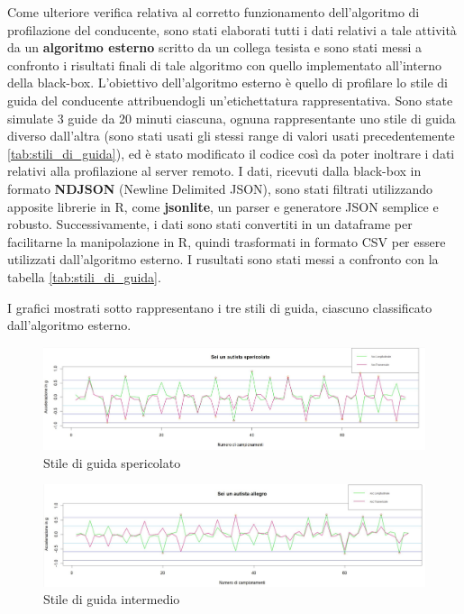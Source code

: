 \documentclass[12pt, a4paper, italian]{report}
\numberwithin{figure}{chapter}
\numberwithin{table}{chapter}
\begin{document}
Come ulteriore verifica relativa al corretto funzionamento dell'algoritmo di profilazione del conducente, sono stati elaborati tutti i dati relativi a tale attività da un \textbf{algoritmo esterno} scritto da un collega tesista e sono stati messi a confronto i risultati finali di tale algoritmo con quello implementato all'interno della black-box. L'obiettivo dell'algoritmo esterno è quello di profilare lo stile di guida del conducente attribuendogli un'etichettatura rappresentativa. Sono state simulate 3 guide da 20 minuti ciascuna, ognuna rappresentante uno stile di guida diverso dall'altra (sono stati usati gli stessi range di valori usati precedentemente \ref{tab:stili_di_guida}), ed è stato modificato il codice così da poter inoltrare i dati relativi alla profilazione al server remoto. I dati, ricevuti dalla black-box in formato \textbf{NDJSON} (Newline Delimited JSON), sono stati filtrati utilizzando apposite librerie in R, come \textbf{jsonlite}, un parser e generatore JSON semplice e robusto. Successivamente, i dati sono stati convertiti in un dataframe per facilitarne la manipolazione in R, quindi trasformati in formato CSV per essere utilizzati dall'algoritmo esterno. I rusultati sono stati messi a confronto con la tabella \ref{tab:stili_di_guida}.

\newpage

I grafici mostrati sotto rappresentano i tre stili di guida, ciascuno classificato dall'algoritmo esterno. 

\vspace{1cm}

\begin{figure}[h]
  \centering
  \includegraphics[width=14cm]{GuidaSpericolata.png}
  \caption{Stile di guida spericolato}
  \label{Guida spericolata}
\end{figure}

\begin{figure}[h]
  \centering
  \includegraphics[width=14cm]{GuidaIntermedia.png}
  \caption{Stile di guida intermedio}
  \label{Guida intermedia}
\end{figure}
\end{document}
